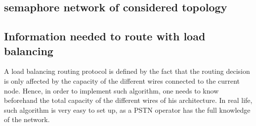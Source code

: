 \documentclass[lettersize,journal]{IEEEtran} %
\begin{document}
\subsection{semaphore network of considered topology}


\subsection{Information needed to route with load balancing}
A load balancing routing protocol is defined by the fact that the routing decision is
only affected by the capacity of the different wires connected to the current node. Hence, 
in order to implement such algorithm, one needs to know beforehand the total capacity of the
different wires of his architecture. In real life, such algorithm is very easy to set up,
as a PSTN operator has the full knowledge of the network.
\end{document}
